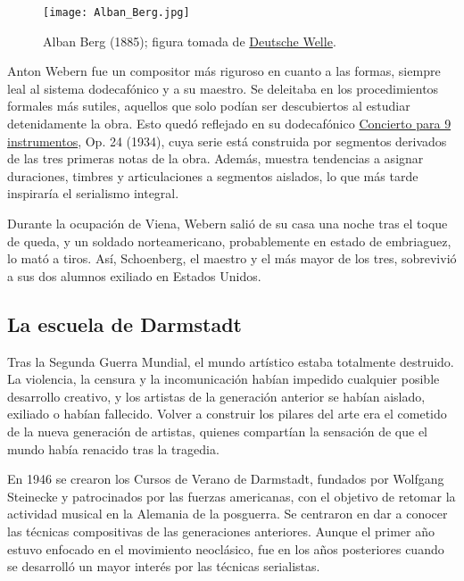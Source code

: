 	\begin{figure}[h]
		\begin{center}
			\texttt{[image: Alban\_Berg.jpg]}\\
			\caption{Alban Berg (1885); figura tomada de \href{https://www.dw.com/pt-br/berg-concerto-para-violino/a-4219906}{Deutsche Welle}.}
		\end{center}
	\end{figure}
	
	Anton Webern fue un compositor m\'as riguroso en cuanto a las formas, siempre leal al sistema dodecaf\'onico y a su maestro. Se deleitaba en los procedimientos formales m\'as sutiles, aquellos que solo pod\'ian ser descubiertos al estudiar detenidamente la obra. Esto qued\'o reflejado en su dodecaf\'onico \href{https://www.youtube.com/watch?v=BqFetTU05wE}{Concierto para 9 instrumentos}, Op. 24 (1934), cuya serie est\'a construida por segmentos derivados de las tres primeras notas de la obra. Adem\'as, muestra tendencias a asignar duraciones, timbres y articulaciones a segmentos aislados, lo que m\'as tarde inspirar\'ia el serialismo integral.
        
	Durante la ocupaci\'on de Viena, Webern sali\'o de su casa una noche tras el toque de queda, y un soldado norteamericano, probablemente en estado de embriaguez, lo mat\'o a tiros. As\'i, Schoenberg, el maestro y el m\'as mayor de los tres, sobrevivi\'o a sus dos alumnos exiliado en Estados Unidos.
    
	\subsection{La escuela de Darmstadt}
	Tras la Segunda Guerra Mundial, el mundo art\'istico estaba totalmente destruido. La violencia, la censura y la incomunicaci\'on hab\'ian impedido cualquier posible desarrollo creativo, y los artistas de la generaci\'on anterior se hab\'ian aislado, exiliado o hab\'ian fallecido. Volver a construir los pilares del arte era el cometido de la nueva generaci\'on de artistas, quienes compart\'ian la sensaci\'on de que el mundo hab\'ia renacido tras la tragedia.
	
	En 1946 se crearon los Cursos de Verano de Darmstadt, fundados por Wolfgang Steinecke y patrocinados por las fuerzas americanas, con el objetivo de retomar la actividad musical en la Alemania de la posguerra. Se centraron en dar a conocer las t\'ecnicas compositivas de las generaciones anteriores. Aunque el primer a\~no estuvo enfocado en el movimiento neocl\'asico, fue en los a\~nos posteriores cuando se desarroll\'o un mayor inter\'es por las t\'ecnicas serialistas.
	
